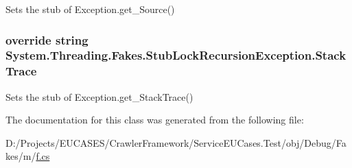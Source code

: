 Sets the stub of Exception.\-get\-\_\-\-Source()

\hypertarget{class_system_1_1_threading_1_1_fakes_1_1_stub_lock_recursion_exception_abc8b442973fd3f5e7983f0acd391172e}{
\subsubsection[{Stack\-Trace}]{\setlength{\rightskip}{0pt plus 5cm}override string System.\-Threading.\-Fakes.\-Stub\-Lock\-Recursion\-Exception.\-Stack\-Trace\hspace{0.3cm}{\ttfamily [get]}}}\label{class_system_1_1_threading_1_1_fakes_1_1_stub_lock_recursion_exception_abc8b442973fd3f5e7983f0acd391172e}


Sets the stub of Exception.\-get\-\_\-\-Stack\-Trace()



The documentation for this class was generated from the following file\-:\begin{DoxyCompactItemize}
\item 
D\-:/\-Projects/\-E\-U\-C\-A\-S\-E\-S/\-Crawler\-Framework/\-Service\-E\-U\-Cases.\-Test/obj/\-Debug/\-Fakes/m/\hyperlink{m_2f_8cs}{f.\-cs}\end{DoxyCompactItemize}
